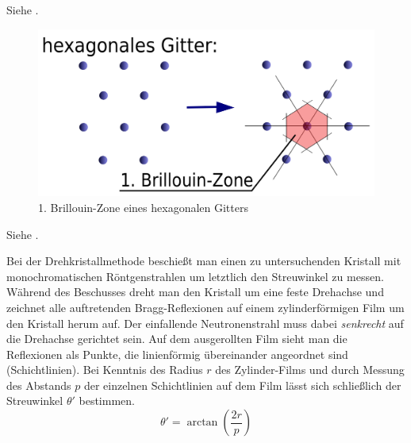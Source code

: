 \label{q:74}

Siehe .

\label{q:75}

\begin{figure}[H]
    \centering
    \begin{samepage}
        \includegraphics[width=0.6\linewidth]{resources/31-10-2013/BZ1_hexagonal.png}
        \caption{1. Brillouin-Zone eines hexagonalen Gitters}
    \end{samepage}
\end{figure}

\label{q:76}

Siehe .

\label{q:77}

Bei der Drehkristallmethode beschießt man einen zu untersuchenden Kristall mit monochromatischen Röntgenstrahlen um letztlich den Streuwinkel zu messen. Während des Beschusses dreht man den Kristall um eine feste Drehachse und zeichnet alle auftretenden Bragg-Reflexionen auf einem zylinderförmigen Film um den Kristall herum auf. Der einfallende Neutronenstrahl muss dabei \textit{senkrecht} auf die Drehachse gerichtet sein. Auf dem ausgerollten Film sieht man die Reflexionen als Punkte, die linienförmig übereinander angeordnet sind (Schichtlinien). Bei Kenntnis des Radius $r$ des Zylinder-Films und durch Messung des Abstands $p$ der einzelnen Schichtlinien auf dem Film lässt sich schließlich der Streuwinkel $\theta'$ bestimmen.
\begin{equation}
    \label{eq:drehkristallmethode}
    \theta' = \arctan\left(\frac{2r}{p}\right)
\end{equation}

\label{q:78}


